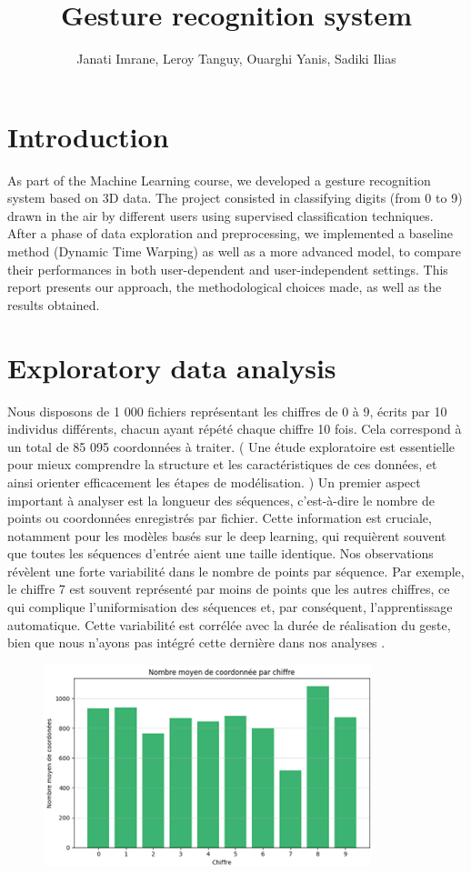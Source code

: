 \documentclass{article}
\author{Janati Imrane, Leroy Tanguy, Ouarghi Yanis, Sadiki Ilias}
\date{}
\begin{document}
\title{Gesture recognition system}
\maketitle

\section{Introduction}
As part of the Machine Learning course, 
we developed a gesture recognition system based on 3D data. 
The project consisted in classifying digits (from 0 to 9) 
drawn in the air by different users using supervised classification techniques. 
After a phase of data exploration and preprocessing, 
we implemented a baseline method (Dynamic Time Warping) 
as well as a more advanced model, to compare their performances 
in both user-dependent and user-independent settings. 
This report presents our approach, the methodological choices made, 
as well as the results obtained.

\section{Exploratory data analysis}
Nous disposons de 1 000 fichiers représentant les chiffres de 0 à 9, écrits par 10 individus différents, chacun ayant répété chaque chiffre 10 fois. Cela correspond à un total de 85 095 coordonnées à traiter.
( Une étude exploratoire est essentielle pour mieux comprendre la structure et les caractéristiques de ces données, et ainsi orienter efficacement les étapes de modélisation. )
Un premier aspect important à analyser est la longueur des séquences, c’est-à-dire le nombre de points ou coordonnées enregistrés par fichier. Cette information est cruciale, notamment pour les modèles basés sur le deep learning, qui requièrent souvent que toutes les séquences d’entrée aient une taille identique.
Nos observations révèlent une forte variabilité dans le nombre de points par séquence. Par exemple, le chiffre 7 est souvent représenté par moins de points que les autres chiffres, ce qui complique l’uniformisation des séquences et, par conséquent, l’apprentissage automatique. 
Cette variabilité est corrélée avec la durée de réalisation du geste, bien que nous n’ayons pas intégré cette dernière dans nos analyses .

\begin{figure}[H]
    \includegraphics[width=\textwidth]{coord_par_chiffres.png}
\end{figure}
\end{document}

